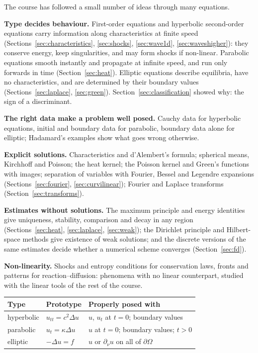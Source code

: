 \documentclass[11pt,a4paper]{article}
\numberwithin{equation}{section}
\theoremstyle{definition}
\begin{document}
The course has followed a small number of ideas through many equations.

\textbf{Type decides behaviour.} First-order equations and hyperbolic second-order equations carry information along characteristics at finite speed (Sections~\ref{sec:characteristics}, \ref{sec:shocks}, \ref{sec:wave1d}, \ref{sec:waveshigher}): they conserve energy, keep singularities, and may form shocks if non-linear. Parabolic equations smooth instantly and
propagate at infinite speed, and run only forwards in time (Section~\ref{sec:heat}). Elliptic equations describe equilibria, have no characteristics, and are determined by their boundary values (Sections~\ref{sec:laplace}, \ref{sec:green}). Section~\ref{sec:classification} showed why: the sign of a discriminant.

\textbf{The right data make a problem well posed.} Cauchy data for hyperbolic equations, initial and boundary data for parabolic, boundary data alone for elliptic; Hadamard's examples show what goes wrong otherwise.

\textbf{Explicit solutions.} Characteristics and d'Alembert's formula; spherical means, Kirchhoff and Poisson; the heat kernel; the Poisson kernel and Green's functions with images; separation of variables with Fourier, Bessel and Legendre expansions (Sections~\ref{sec:fourier}, \ref{sec:curvilinear}); Fourier and Laplace transforms
(Section~\ref{sec:transforms}).

\textbf{Estimates without solutions.} The maximum principle and energy identities give uniqueness, stability, comparison and decay in any region (Sections~\ref{sec:heat}, \ref{sec:laplace}, \ref{sec:weak}); the Dirichlet principle and Hilbert-space methods give existence of weak solutions; and the discrete versions of the same estimates
decide whether a numerical scheme converges (Section~\ref{sec:fd}).

\textbf{Non-linearity.} Shocks and entropy conditions for conservation laws, fronts and patterns for reaction--diffusion: phenomena with no linear counterpart, studied with the linear tools of the rest of the course.

\begin{center}
\small
\begin{tabular}{lll}
\hline
\textbf{Type} & \textbf{Prototype} & \textbf{Properly posed with} \\
\hline
hyperbolic & $u_{tt} = c^2\Delta u$ & $u$, $u_t$ at $t = 0$; boundary values \\
parabolic & $u_t = \kappa\Delta u$ & $u$ at $t = 0$; boundary values; $t > 0$ \\
elliptic & $-\Delta u = f$ & $u$ or $\partial_\nu u$ on all of $\partial\Omega$ \\
\hline
\end{tabular}
\end{center}
\end{document}
